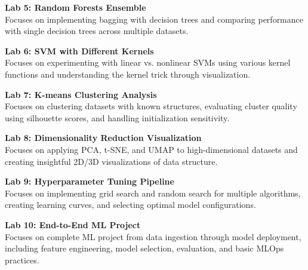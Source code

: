 \vspace{0.2cm}

\noindent\textbf{Lab 5: Random Forests Ensemble} \\
Focuses on implementing bagging with decision trees and comparing performance with single decision trees across multiple datasets.

\vspace{0.2cm}

\noindent\textbf{Lab 6: SVM with Different Kernels} \\
Focuses on experimenting with linear vs. nonlinear SVMs using various kernel functions and understanding the kernel trick through visualization.

\vspace{0.2cm}

\noindent\textbf{Lab 7: K-means Clustering Analysis} \\
Focuses on clustering datasets with known structures, evaluating cluster quality using silhouette scores, and handling initialization sensitivity.

\vspace{0.2cm}

\noindent\textbf{Lab 8: Dimensionality Reduction Visualization} \\
Focuses on applying PCA, t-SNE, and UMAP to high-dimensional datasets and creating insightful 2D/3D visualizations of data structure.

\vspace{0.2cm}

\noindent\textbf{Lab 9: Hyperparameter Tuning Pipeline} \\
Focuses on implementing grid search and random search for multiple algorithms, creating learning curves, and selecting optimal model configurations.

\vspace{0.2cm}

\noindent\textbf{Lab 10: End-to-End ML Project} \\
Focuses on complete ML project from data ingestion through model deployment, including feature engineering, model selection, evaluation, and basic MLOps practices.

\vspace{0.2cm}

\newpage
{}
